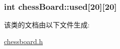 \subsubsection[{\texorpdfstring{used}{used}}]{\setlength{\rightskip}{0pt plus 5cm}int chess\+Board\+::used\mbox{[}20\mbox{]}\mbox{[}20\mbox{]}\hspace{0.3cm}{\ttfamily [private]}}\hypertarget{classchess_board_a606a859d2b32d470d04b0115ececc200_a606a859d2b32d470d04b0115ececc200}{}\label{classchess_board_a606a859d2b32d470d04b0115ececc200_a606a859d2b32d470d04b0115ececc200}


该类的文档由以下文件生成\+:\begin{DoxyCompactItemize}
\item 
\hyperlink{chessboard_8h}{chessboard.\+h}\end{DoxyCompactItemize}
